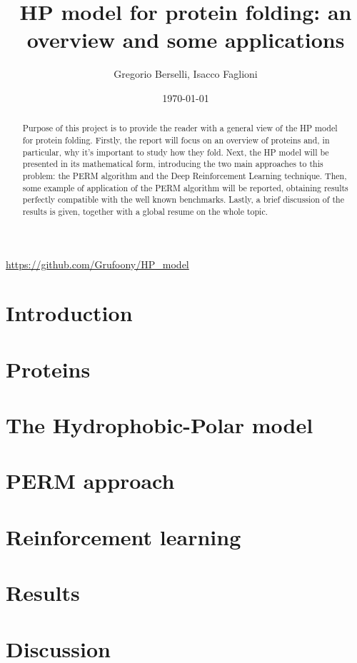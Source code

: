 \documentclass[12pt,a4paper]{article}
\title{HP model for protein folding: an overview and some applications}
\author{Gregorio Berselli, Isacco Faglioni}
\date{\today}
\begin{document}
\maketitle
\begin{center}
	\url{https://github.com/Grufoony/HP_model}
\end{center}

\begin{abstract}
Purpose of this project is to provide the reader with a general view of the HP model for protein folding.
Firstly, the report will focus on an overview of proteins and, in particular, why it's important to study how they fold.
Next, the HP model will be presented in its mathematical form, introducing the two main approaches to this problem: the PERM algorithm and the Deep Reinforcement Learning technique.
Then, some example of application of the PERM algorithm will be reported, obtaining results perfectly compatible with the well known benchmarks.
Lastly, a brief discussion of the results is given, together with a global resume on the whole topic.
\end{abstract}
\thispagestyle{empty}

\newpage
\thispagestyle{empty}
\addtocounter{page}{-2}
\mbox{}

\tableofcontents
\pagebreak

\section*{Introduction}

\pagebreak

\section{Proteins}

\pagebreak

\section{The Hydrophobic-Polar model} \label{sec:model}

\pagebreak

\section{PERM approach}

\pagebreak

\section{Reinforcement learning}

\pagebreak

\section{Results}

\pagebreak

\section{Discussion}

\pagebreak

\newpage
\thispagestyle{empty}
\mbox{}

\printbibliography
\end{document}
